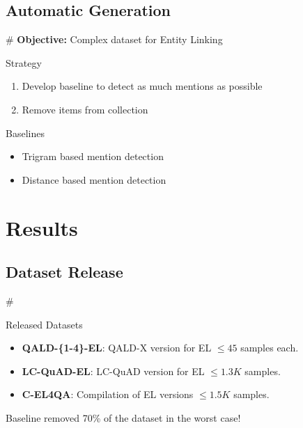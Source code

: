 \documentclass[]{beamer}
\def\mAlertSpace{\vspace{0.5em}}
\newcommand{\mSlideTitle}{{{\color{gray}\secname}} \# \subsecname}
\begin{document}
\subsection{Automatic Generation}
  \begin{frame}{\mSlideTitle}
    \textcolor{mLightBrown}{\textbf{Objective:}} Complex dataset for Entity Linking
    \begin{alertblock}{Strategy}
      \begin{enumerate}
        \item Develop baseline to detect as much mentions as possible
        \item Remove items from collection
      \end{enumerate}
    \end{alertblock}
    \begin{alertblock}{Baselines}
      \begin{itemize}
        \item Trigram based mention detection
        \item Distance based mention detection
      \end{itemize}
    \end{alertblock}
  \end{frame}

\section{Results}
\subsection{Dataset Release}
  \begin{frame}{\mSlideTitle}
    \begin{alertblock}{Released Datasets}
      \begin{itemize}
        \item \textbf{QALD-\{1-4\}-EL}: QALD-X version for EL $\le 45$ samples each.
        \item \textbf{LC-QuAD-EL}: LC-QuAD version for EL $\le 1.3K$ samples.
        \item \textbf{C-EL4QA}: Compilation of EL versions $\le 1.5K$ samples.
      \end{itemize}
      \mAlertSpace
      Baseline removed 70\% of the dataset in the worst case!
    \end{alertblock}
  \end{frame}
\end{document}
